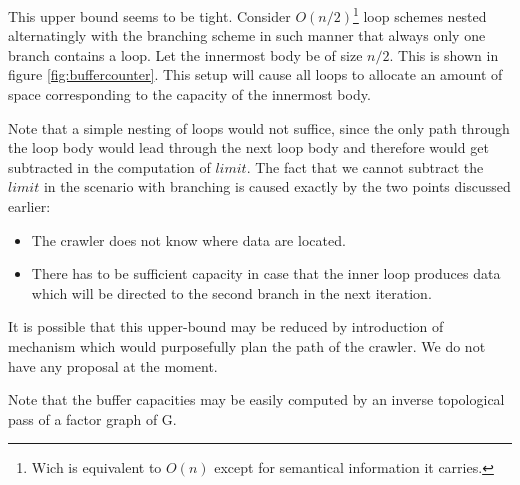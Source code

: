 This upper bound seems to be tight. Consider $O(n/2)$\footnote{Wich is equivalent to $O(n)$ except for semantical information it carries.} loop schemes nested alternatingly with the branching scheme in such manner that always only one branch contains a loop. Let the innermost body be of size $n/2$. This is shown in figure \ref{fig:buffercounter}. This setup will cause all loops to allocate an amount of space corresponding to the capacity of the innermost body.


Note that a simple nesting of loops would not suffice, since the only path through the loop body would lead through the next loop body and therefore would get subtracted in the computation of $limit$. The fact that we cannot subtract the $limit$ in the scenario with branching is caused exactly by the two points discussed earlier:
\begin{itemize}
  \item The crawler does not know where data are located.
  \item There has to be sufficient capacity in case that the inner loop produces data which will be directed to the second branch in the next iteration. 
\end{itemize}

It is possible that this upper-bound may be reduced by introduction of mechanism which would purposefully plan the path of the crawler. We do not have any proposal at the moment.
  


\begin{rem}
  Note that the buffer capacities may be easily computed by an inverse topological pass of a factor graph of G. 
\end{rem}



